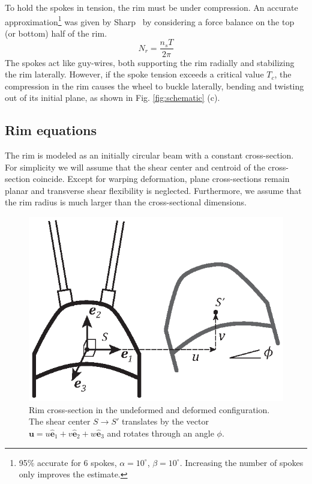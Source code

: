 \documentclass{bmd2016p}
\newcommand{\e}{\ensuremath{\hat{\bm{e}}_1}}
\newcommand{\ee}{\ensuremath{\hat{\bm{e}}_2}}
\newcommand{\eee}{\ensuremath{\hat{\bm{e}}_3}}
\begin{document}
To hold the spokes in tension, the rim must be under compression. An accurate approximation\footnote{95\% accurate for 6 spokes, $\alpha=10^{\circ}$, $\beta=10^{\circ}$. Increasing the number of spokes only improves the estimate.} was given by Sharp~\cite{Sharp1977a} by considering a force balance on the top (or bottom) half of the rim.
	\begin{equation}\label{eq:TN}
	N_r = \frac{n_sT}{2\pi}
	\end{equation}
The spokes act like guy-wires, both supporting the rim radially and stabilizing the rim laterally. However, if the spoke tension exceeds a critical value $T_c$, the compression in the rim causes the wheel to buckle laterally, bending and twisting out of its initial plane, as shown in Fig. \ref{fig:schematic} (c).


\subsection{Rim equations}

The rim is modeled as an initially circular beam with a constant cross-section. For simplicity we will assume that the shear center and centroid of the cross-section coincide. Except for warping deformation, plane cross-sections remain planar and transverse shear flexibility is neglected. Furthermore, we assume that the rim radius is much larger than the cross-sectional dimensions.

\begin{figure}[!ht]
\centering
\includegraphics[scale=1.0]{figures/bmd_figures-06.eps}
\caption{Rim cross-section in the undeformed and deformed configuration. The shear center $S\rightarrow S'$ translates by the vector $\bm{u} = u\e + v\ee + w\eee$ and rotates through an angle $\phi$.}
\label{fig:def}
\end{figure}
\end{document}
